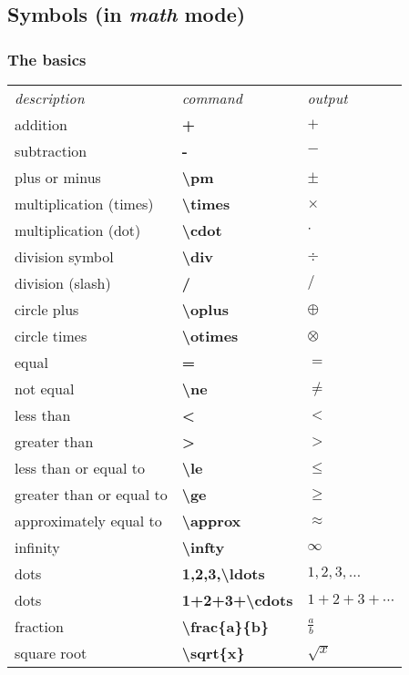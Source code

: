 \documentclass{article}
\begin{document}
\subsection{Symbols (in \textit{math} mode)}
\subsubsection{The basics}
\begin{table}[H]
 \begin{tabular}{lll}
  \textit{description} &\textit{command} &\textit{output}\\
  addition &\textbf{+} &$+$\\
  subtraction &\textbf{-} &$-$\\
  plus or minus &\textbf{\textbackslash pm} &$\pm$\\
  multiplication (times) &\textbf{\textbackslash times} &$\times$\\
  multiplication (dot) &\textbf{\textbackslash cdot} &$\cdot$\\
  division symbol &\textbf{\textbackslash div} &$\div$\\
  division (slash) &\textbf{/} &$/$\\
  circle plus &\textbf{\textbackslash oplus} &$\oplus$\\
  circle times &\textbf{\textbackslash otimes} &$\otimes$\\
  equal &\textbf{=} &$=$\\
  not equal &\textbf{\textbackslash ne} &$\ne$\\
  less than &\textbf{\textless} &$<$\\
  greater than &\textbf{\textgreater} &$>$\\
  less than or equal to &\textbf{\textbackslash le} &$\le$\\
  greater than or equal to &\textbf{\textbackslash ge} &$\ge$\\
  approximately equal to &\textbf{\textbackslash approx} &$\approx$\\
  infinity &\textbf{\textbackslash infty} &$\infty$\\
  dots &\textbf{1,2,3,\textbackslash ldots} &$1,2,3,\ldots$\\
  dots &\textbf{1+2+3+\textbackslash cdots} &$1+2+3+\cdots$\\
  fraction &\textbf{\textbackslash frac\{a\}\{b\}} &$\frac{a}{b}$\\
  square root &\textbf{\textbackslash sqrt\{x\}} &$\sqrt{x}$\\

\end{tabular}
\end{table}
\end{document}

